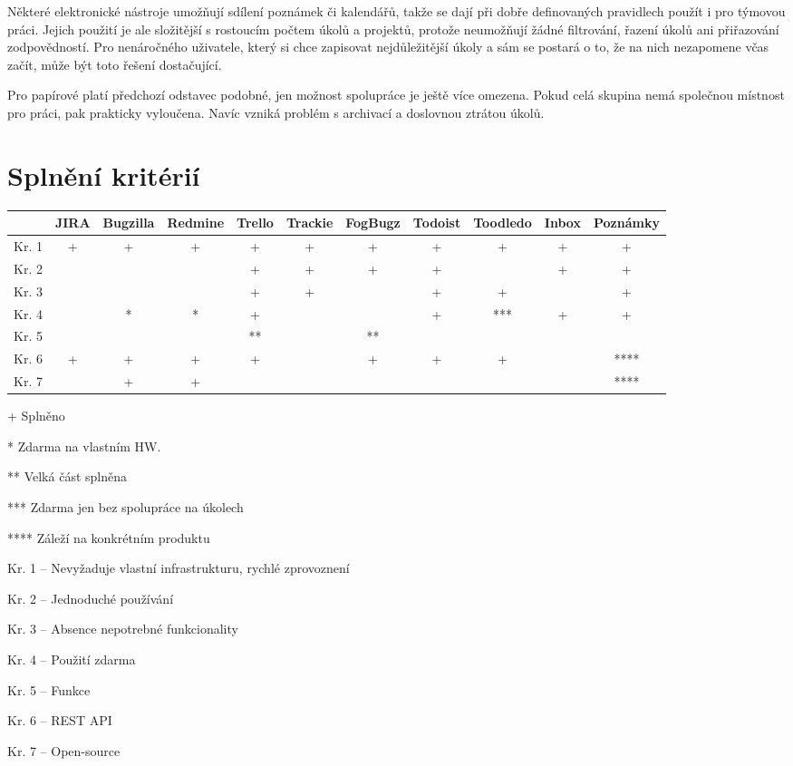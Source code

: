 \documentclass[thesis=B,czech]{FITthesis}[2012/06/26]
\newcommand{\crita}{Nevyžaduje vlastní infrastrukturu, rychlé zprovoznení}
\newcommand{\critb}{Jednoduché používání}
\newcommand{\critc}{Absence nepotrebné funkcionality}
\newcommand{\critd}{Použití zdarma}
\newcommand{\crite}{Funkce}
\newcommand{\critf}{REST API}
\newcommand{\critg}{Open-source}
\begin{document}
			Některé elektronické nástroje umožňují sdílení poznámek či kalendářů, takže se dají při dobře definovaných pravidlech použít i pro týmovou práci. Jejich použití je ale složitější s rostoucím počtem úkolů a projektů, protože neumožňují žádné filtrování, řazení úkolů ani přiřazování zodpovědností. Pro nenáročného uživatele, který si chce zapisovat nejdůležitější úkoly a sám se postará o to, že na nich nezapomene včas začít, může být toto řešení dostačující.
			
			Pro papírové  platí předchozí odstavec podobné, jen možnost spolupráce je ještě více omezena. Pokud celá skupina nemá společnou místnost pro práci, pak prakticky vyloučena. Navíc vzniká problém s archivací a doslovnou ztrátou úkolů.
		
	
	\section{Splnění kritérií}


	\begin{sidewaystable}
	\begin{threeparttable}
		\begin{tabular}{|c||c|c|c|c|c|c|c|c|c|c|}
			\hline
			      & JIRA & Bugzilla & Redmine & Trello & Trackie & FogBugz & Todoist & Toodledo & Inbox & Poznámky \\ \hline \hline
			Kr. 1 & + & + & + & +  & + & +  & + & +   & + & +    \\ \hline
			Kr. 2 & ~ & ~ & ~ & +  & + & +  & + & ~   & + & +    \\ \hline
			Kr. 3 & ~ & ~ & ~ & +  & + & ~  & + & +   & ~ & +    \\ \hline
			Kr. 4 & ~ & * & * & +  & ~ & ~  & + & *** & + & +    \\ \hline
			Kr. 5 & ~ & ~ & ~ & ** & ~ & ** & ~ & ~   & ~ & ~    \\ \hline
			Kr. 6 & + & + & + & +  & ~ & +  & + & +   & ~ & ****    \\ \hline
			Kr. 7 & ~ & + & + & ~  & ~ & ~  & ~ & ~   & ~ & **** \\
			\hline
		\end{tabular}
		
		\begin{tablenotes}
			\item[+] Splněno
			\item[*] Zdarma na vlastním HW.
			\item[**] Velká část splněna
			\item[***] Zdarma jen bez spolupráce na úkolech
			\item[****] Záleží na konkrétním produktu
			\item Kr. 1 -- \crita
			\item Kr. 2 -- \critb
			\item Kr. 3 -- \critc
			\item Kr. 4 -- \critd
			\item Kr. 5 -- \crite
			\item Kr. 6 -- \critf
			\item Kr. 7 -- \critg
		\end{tablenotes}
	\end{threeparttable}		
	\end{sidewaystable}
	
\end{document}
